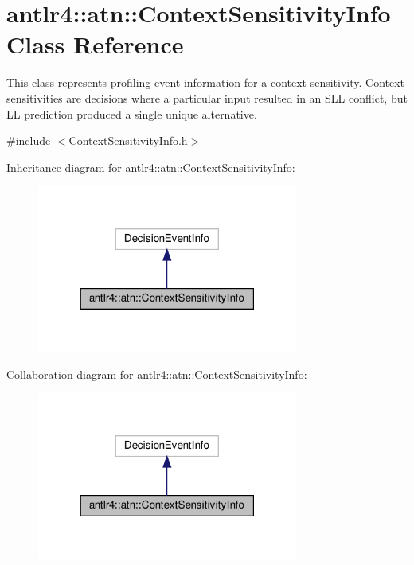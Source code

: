 \hypertarget{classantlr4_1_1atn_1_1ContextSensitivityInfo}{}\section{antlr4\+:\+:atn\+:\+:Context\+Sensitivity\+Info Class Reference}
\label{classantlr4_1_1atn_1_1ContextSensitivityInfo}


This class represents profiling event information for a context sensitivity. Context sensitivities are decisions where a particular input resulted in an S\+LL conflict, but LL prediction produced a single unique alternative.  




{\ttfamily \#include $<$Context\+Sensitivity\+Info.\+h$>$}



Inheritance diagram for antlr4\+:\+:atn\+:\+:Context\+Sensitivity\+Info\+:
\nopagebreak
\begin{figure}[H]
\begin{center}
\leavevmode
\includegraphics[width=243pt]{classantlr4_1_1atn_1_1ContextSensitivityInfo__inherit__graph}
\end{center}
\end{figure}


Collaboration diagram for antlr4\+:\+:atn\+:\+:Context\+Sensitivity\+Info\+:
\nopagebreak
\begin{figure}[H]
\begin{center}
\leavevmode
\includegraphics[width=243pt]{classantlr4_1_1atn_1_1ContextSensitivityInfo__coll__graph}
\end{center}
\end{figure}

